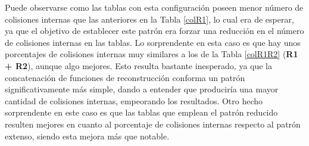 \documentclass[12pt,spanish,listoffigures,listoftables,listofalgorithms]{tfgetsinf}
\begin{document}
\def\arraystretch{1.5}
\begin{table}[H]
	\centering
	\caption{Porcentajes de colisiones para las tablas empleando el patrón extenso}
	\label{colPG}
\end{table}

Puede observarse como las tablas con esta configuración poseen menor número de colisiones internas que las anteriores en la Tabla \ref{colR1}, lo cual era de esperar, ya que el objetivo de establecer este patrón era forzar una reducción en el número de colisiones internas en las tablas. Lo sorprendente en esta caso es que hay unos porcentajes de colisiones internas muy similares a los de la Tabla \ref{colR1R2} (\textbf{R1 + R2}), aunque algo mejores. Esto resulta bastante inesperado, ya que la concatenación de funciones de reconstrucción conforma un patrón significativamente más simple, dando a entender que produciría una mayor cantidad de colisiones internas, empeorando los resultados. Otro hecho sorprendente en este caso es que las tablas que emplean el patrón reducido resulten mejores en cuanto al porcentaje de colisiones internas respecto al patrón extenso, siendo esta mejora más que notable.
\end{document}
